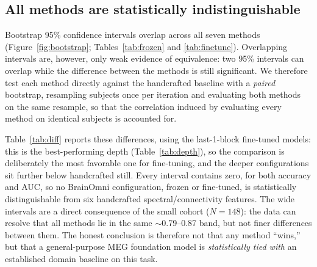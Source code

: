 \documentclass[11pt]{article}
\begin{document}
\subsection{All methods are statistically indistinguishable}
Bootstrap 95\% confidence intervals overlap across all seven methods (Figure~\ref{fig:bootstrap};
Tables~\ref{tab:frozen} and \ref{tab:finetune}). Overlapping intervals are, however, only weak
evidence of equivalence: two 95\% intervals can overlap while the difference between the methods is
still significant. We therefore test each method directly against the handcrafted baseline with a
\emph{paired} bootstrap, resampling subjects once per iteration and evaluating both methods on the
same resample, so that the correlation induced by evaluating every method on identical subjects is
accounted for.

Table~\ref{tab:diff} reports these differences, using the last-1-block fine-tuned models: this is
the best-performing depth (Table~\ref{tab:depth}), so the comparison is deliberately the most
favorable one for fine-tuning, and the deeper configurations sit further below handcrafted still.
Every interval contains zero, for both accuracy and AUC, so no BrainOmni configuration, frozen or
fine-tuned, is statistically distinguishable from six handcrafted spectral/connectivity features.
The wide intervals are a direct consequence of the small
cohort ($N=148$): the data can resolve that all methods lie in the same $\sim$0.79--0.87 band, but
not finer differences between them. The honest conclusion is therefore not that any method ``wins,''
but that a general-purpose MEG foundation model is \emph{statistically tied with} an established
domain baseline on this task.
\end{document}

